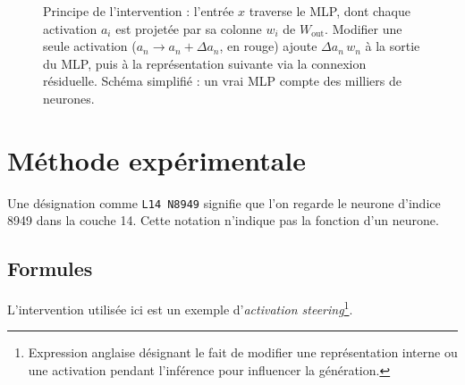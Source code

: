 \documentclass[11pt,a4paper]{article}
\begin{document}
\begin{figure}[htbp]
{}
\caption{Principe de l'intervention : l'entrée $x$ traverse le MLP, dont chaque activation $a_i$ est projetée par sa colonne $w_i$ de $W_{\mathrm{out}}$. Modifier une seule activation ($a_n \to a_n+\Delta a_n$, en rouge) ajoute $\Delta a_n\,w_n$ à la sortie du MLP, puis à la représentation suivante via la connexion résiduelle. Schéma simplifié : un vrai MLP compte des milliers de neurones.}
\label{fig:neuron}
\end{figure}




\section{Méthode expérimentale}


Une désignation comme \texttt{L14 N8949} signifie que l'on regarde le neurone d'indice 8949 dans la couche 14. Cette notation n'indique pas la fonction d'un neurone.


\subsection{Formules}

L'intervention utilisée ici est un exemple d'\emph{activation steering}\footnote{Expression anglaise désignant le fait de modifier une représentation interne ou une activation pendant l'inférence pour influencer la génération.}. 
\end{document}
